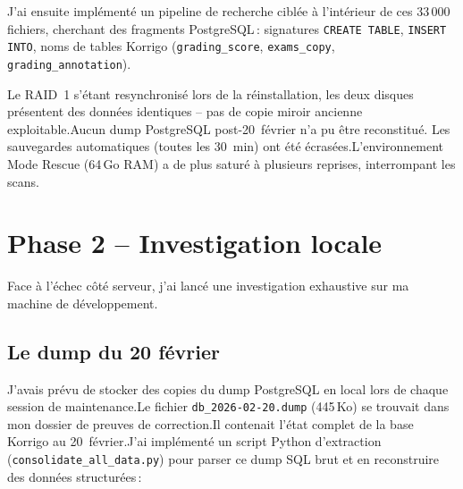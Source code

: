 \documentclass[11pt,a4paper]{article}
\begin{document}
J'ai ensuite impl\'{e}ment\'{e} un pipeline de recherche cibl\'{e}e \`{a} l'int\'{e}rieur de ces 33\,000 fichiers, cherchant des fragments PostgreSQL\,: signatures \texttt{CREATE TABLE}, \texttt{INSERT INTO}, noms de tables Korrigo (\texttt{grading\_score}, \texttt{exams\_copy}, \texttt{grading\_annotation}).

\begin{kobox}
	Le RAID~1 s'\'{e}tant resynchronis\'{e} lors de la r\'{e}installation, les deux disques pr\'{e}sentent des donn\'{e}es identiques -- pas de copie miroir ancienne exploitable.\@ Aucun dump PostgreSQL post-20~f\'{e}vrier n'a pu \^{e}tre reconstitu\'{e}. Les sauvegardes automatiques (toutes les 30~min) ont \'{e}t\'{e} \'{e}cras\'{e}es.\@ L'environnement Mode Rescue (64\,Go RAM) a de plus satur\'{e} \`{a} plusieurs reprises, interrompant les scans.
\end{kobox}

\section{Phase 2 -- Investigation locale}

Face \`{a} l'\'{e}chec c\^{o}t\'{e} serveur, j'ai lanc\'{e} une investigation exhaustive sur ma machine de d\'{e}veloppement.

\subsection{Le dump du 20 f\'{e}vrier}

J'avais pr\'{e}vu de stocker des copies du dump PostgreSQL en local lors de chaque session de maintenance.\@ Le fichier \texttt{db\_2026-02-20.dump} (445\,Ko) se trouvait dans mon dossier de preuves de correction.\@ Il contenait l'\'{e}tat complet de la base Korrigo au 20~f\'{e}vrier.\@ J'ai impl\'{e}ment\'{e} un script Python d'extraction (\texttt{consolidate\_all\_data.py}) pour parser ce dump SQL brut et en reconstruire des donn\'{e}es structur\'{e}es\,:
\end{document}
